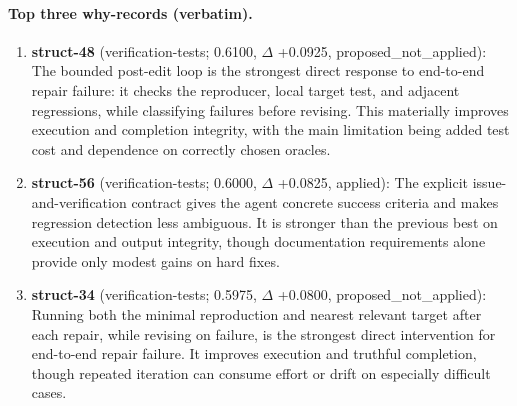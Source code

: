 \paragraph{Top three why-records (verbatim).}\begin{enumerate}\itemsep1pt
\item \textbf{struct-48} (verification-tests; 0.6100, $\Delta$ +0.0925, proposed\_not\_applied): The bounded post-edit loop is the strongest direct response to end-to-end repair failure: it checks the reproducer, local target test, and adjacent regressions, while classifying failures before revising. This materially improves execution and completion integrity, with the main limitation being added test cost and dependence on correctly chosen oracles.
\item \textbf{struct-56} (verification-tests; 0.6000, $\Delta$ +0.0825, applied): The explicit issue-and-verification contract gives the agent concrete success criteria and makes regression detection less ambiguous. It is stronger than the previous best on execution and output integrity, though documentation requirements alone provide only modest gains on hard fixes.
\item \textbf{struct-34} (verification-tests; 0.5975, $\Delta$ +0.0800, proposed\_not\_applied): Running both the minimal reproduction and nearest relevant target after each repair, while revising on failure, is the strongest direct intervention for end-to-end repair failure. It improves execution and truthful completion, though repeated iteration can consume effort or drift on especially difficult cases.
\end{enumerate}
